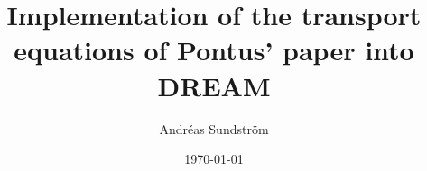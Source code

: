 \documentclass[11pt,a4paper,english
]{article}
\begin{document}


\title{Implementation of the transport equations of 
 Pontus' paper into DREAM}
\author{Andr\'eas Sundstr\"om}
\date{\today}

\maketitle
\end{document}
